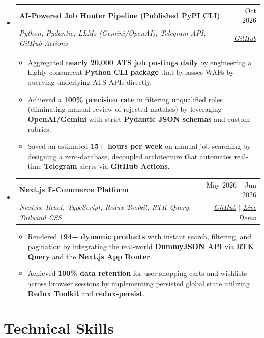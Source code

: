 \documentclass[letterpaper,11pt]{article}
\makeatletter
\newcommand{\resumeItem}[1]{
\item\small{ {#1 \vspace{-2pt}} } }
\newcommand{\resumeSubheading}[4]{
  \vspace{-2pt}
\item
  \begin{tabular*}{0.97\textwidth}[t]{l@{\extracolsep{\fill}}r}
    \textbf{#1} & #2 \\
    \textit{\small#3} & \textit{\small #4} \\
  \end{tabular*}\vspace{-7pt}
}
\newcommand{\resumeSubHeadingListStart}{
  \begin{itemize}[leftmargin=0.15in, label={}, itemsep=-2pt]
    }
\newcommand{\resumeSubHeadingListEnd}{
\end{itemize}}
\newcommand{\resumeItemListStart}{
\begin{itemize}[itemsep=-1pt, parsep=2pt]}
\newcommand{\resumeItemListEnd}{
\end{itemize}\vspace{-5pt}}
\makeatother
\begin{document}
\resumeSubHeadingListStart

\resumeSubheading
{\textbf{AI-Powered Job Hunter Pipeline} (Published PyPI CLI)}{Oct 2026}
{\emph{Python, Pydantic, LLMs (Gemini/OpenAI), Telegram API, GitHub
Actions}}{\href{https://github.com/ziad-aboughaleb/job-hunter}{\underline{GitHub}}}
\resumeItemListStart
\resumeItem{Aggregated \textbf{nearly 20,000 ATS job postings daily}
  by engineering a highly concurrent \textbf{Python CLI package} that
bypasses WAFs by querying underlying ATS APIs directly.}
\resumeItem{Achieved a \textbf{100\% precision rate} in filtering
  unqualified roles (eliminating manual review of rejected matches) by
  leveraging \textbf{OpenAI/Gemini} with strict \textbf{Pydantic JSON
schemas} and custom rubrics.}
\resumeItem{Saved an estimated \textbf{15+ hours per week} on manual
  job searching by designing a zero-database, decoupled architecture
that automates real-time \textbf{Telegram} alerts via \textbf{GitHub Actions}.}
\resumeItemListEnd

\resumeSubheading
{\textbf{Next.js E-Commerce Platform}}{May 2026 -- Jun 2026}
{\emph{Next.js, React, TypeScript, Redux Toolkit, RTK Query,
    Tailwind
CSS}}{\href{https://github.com/ziad-aboughaleb/Store}{\underline{GitHub}}
$|$ \href{https://store-two-mu.vercel.app/}{\underline{Live Demo}}}
\resumeItemListStart
\resumeItem{Rendered \textbf{194+ dynamic products} with instant
  search, filtering, and pagination by integrating the real-world
  \textbf{DummyJSON API} via \textbf{RTK Query} and the \textbf{Next.js
App Router}.}
\resumeItem{Achieved \textbf{100\% data retention} for user shopping
  carts and wishlists across browser sessions by implementing persisted
global state utilizing \textbf{Redux Toolkit} and \textbf{redux-persist}.}
\resumeItemListEnd

\resumeSubHeadingListEnd

\section{Technical Skills}
\end{document}
